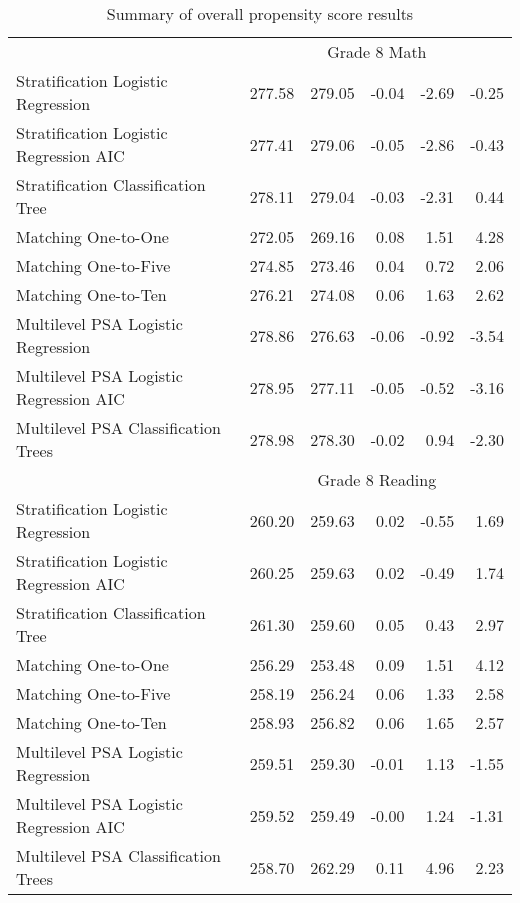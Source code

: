 \begin{table}[ht]
\begin{tabular}{lrrrrr}
    \hline & \multicolumn{5}{c}{Grade 8 Math} \\ \cline{2-6} Stratification Logistic Regression & 277.58 & 279.05 & -0.04 & -2.69 & -0.25 \\ 
  Stratification Logistic Regression AIC & 277.41 & 279.06 & -0.05 & -2.86 & -0.43 \\ 
  Stratification Classification Tree & 278.11 & 279.04 & -0.03 & -2.31 & 0.44 \\ 
  Matching One-to-One & 272.05 & 269.16 & 0.08 & 1.51 & 4.28 \\ 
  Matching One-to-Five & 274.85 & 273.46 & 0.04 & 0.72 & 2.06 \\ 
  Matching One-to-Ten & 276.21 & 274.08 & 0.06 & 1.63 & 2.62 \\ 
  Multilevel PSA Logistic Regression & 278.86 & 276.63 & -0.06 & -0.92 & -3.54 \\ 
  Multilevel PSA Logistic Regression AIC & 278.95 & 277.11 & -0.05 & -0.52 & -3.16 \\ 
  Multilevel PSA Classification Trees & 278.98 & 278.30 & -0.02 & 0.94 & -2.30 \\ 
    \hline & \multicolumn{5}{c}{Grade 8 Reading} \\ \cline{2-6} Stratification Logistic Regression & 260.20 & 259.63 & 0.02 & -0.55 & 1.69 \\ 
  Stratification Logistic Regression AIC & 260.25 & 259.63 & 0.02 & -0.49 & 1.74 \\ 
  Stratification Classification Tree & 261.30 & 259.60 & 0.05 & 0.43 & 2.97 \\ 
  Matching One-to-One & 256.29 & 253.48 & 0.09 & 1.51 & 4.12 \\ 
  Matching One-to-Five & 258.19 & 256.24 & 0.06 & 1.33 & 2.58 \\ 
  Matching One-to-Ten & 258.93 & 256.82 & 0.06 & 1.65 & 2.57 \\ 
  Multilevel PSA Logistic Regression & 259.51 & 259.30 & -0.01 & 1.13 & -1.55 \\ 
  Multilevel PSA Logistic Regression AIC & 259.52 & 259.49 & -0.00 & 1.24 & -1.31 \\ 
  Multilevel PSA Classification Trees & 258.70 & 262.29 & 0.11 & 4.96 & 2.23 \\ 
   \hline
\end{tabular}
\caption{Summary of overall propensity score results} 
\label{tab:overall}
\end{table}
